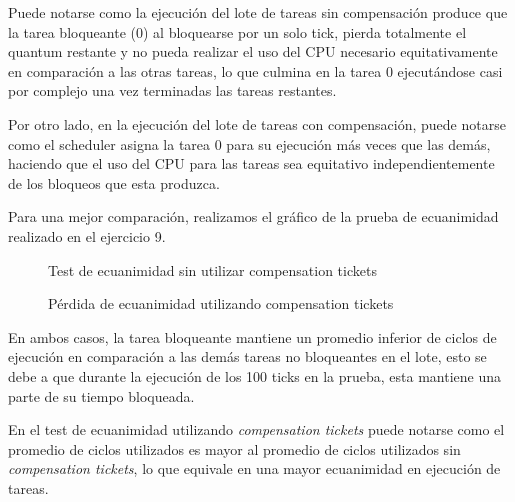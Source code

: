 \documentclass[a4paper,10pt,twoside]{article}
\begin{document}
Puede notarse como la ejecución del lote de tareas sin compensación produce que la tarea bloqueante (0) al bloquearse por un solo tick, pierda totalmente el quantum restante y no pueda realizar el uso del CPU necesario equitativamente en comparación a las otras tareas, lo que culmina en la tarea 0 ejecutándose casi por complejo una vez terminadas las tareas restantes.

Por otro lado, en la ejecución del lote de tareas con compensación, puede notarse como el scheduler asigna la tarea 0 para su ejecución más veces que las demás, haciendo que el uso del CPU para las tareas sea equitativo independientemente de los bloqueos que esta produzca.

Para una mejor comparación, realizamos el gráfico de la prueba de ecuanimidad realizado en el ejercicio 9.

\begin{figure}[H]
	\centering
	
	\caption{Test de ecuanimidad sin utilizar compensation tickets}
\end{figure}

\begin{figure}[H]
	\centering
	
	\caption{Pérdida de ecuanimidad utilizando compensation tickets}
\end{figure}

En ambos casos, la tarea bloqueante mantiene un promedio inferior de ciclos de ejecución en comparación a las demás tareas no bloqueantes en el lote, esto se debe a que durante la ejecución de los 100 ticks en la prueba, esta mantiene una parte de su tiempo bloqueada.

En el test de ecuanimidad utilizando \textit{compensation tickets} puede notarse como el promedio de ciclos utilizados es mayor al promedio de ciclos utilizados sin \textit{compensation tickets}, lo que equivale en una mayor ecuanimidad en ejecución de tareas.
\end{document}
